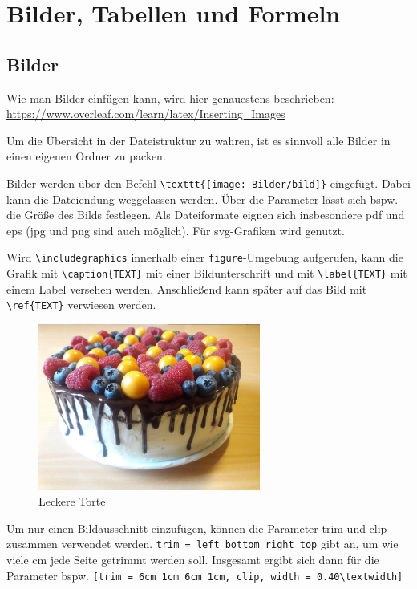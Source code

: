 \chapter{Bilder, Tabellen und Formeln}
\section{Bilder}
Wie man Bilder einfügen kann, wird hier genauestens beschrieben:\\ \url{https://www.overleaf.com/learn/latex/Inserting_Images}

Um die Übersicht in der Dateistruktur zu wahren, ist es sinnvoll alle Bilder in einen eigenen Ordner zu packen.    
    
Bilder werden über den Befehl \verb+\texttt{[image: Bilder/bild]}+ eingefügt. Dabei kann die Dateiendung weggelassen werden.  Über die Parameter lässt sich bspw. die Größe des Bilds festlegen. 
Als Dateiformate eignen sich insbesondere pdf und eps (jpg und png sind auch möglich). Für svg-Grafiken wird \verb++ genutzt.

Wird \verb+\includegraphics+ innerhalb einer \texttt{figure}-Umgebung aufgerufen, kann die Grafik mit \verb+\caption{TEXT}+ mit einer Bildunterschrift und mit \verb+\label{TEXT}+ mit einem Label versehen werden. Anschließend kann später auf das Bild mit \verb+\ref{TEXT}+ verwiesen werden. 


\begin{figure}[h]
\centering
\includegraphics[width = 0.65\textwidth]{Bilder/torte1}
\caption{Leckere Torte}
\end{figure}

Um nur einen Bildausschnitt einzufügen, können die Parameter trim und clip zusammen verwendet werden. \verb+trim = left bottom right top+ gibt an, um wie viele cm jede Seite getrimmt werden soll.
Insgesamt ergibt sich dann für die Parameter bspw. \verb+[trim = 6cm 1cm 6cm 1cm, clip, width = 0.40\textwidth]+


